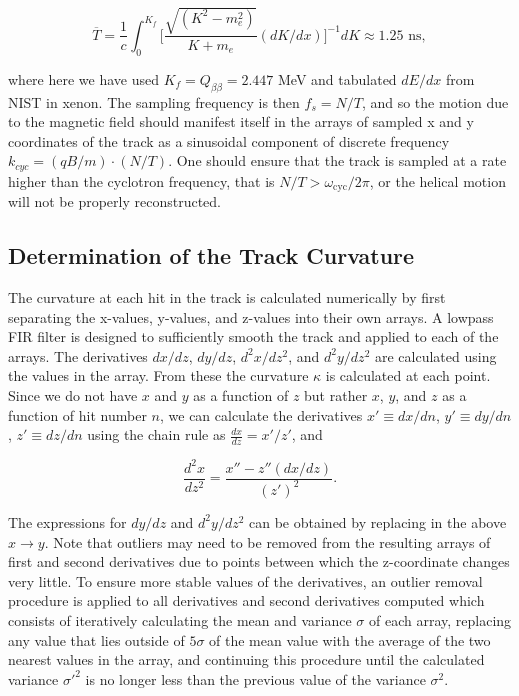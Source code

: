 \documentclass{JINST}
\begin{document}
\begin{equation}
\overline{T} = \frac{1}{c}\int_{0}^{K_{f}} \biggl[\frac{\sqrt{(K^2-m_e^2)}}{K+m_e}(dK/dx)\biggr]^{-1} dK \approx 1.25 \,\, \mathrm{ns},
\end{equation}

\noindent where here we have used $K_{f} = Q_{\beta\beta} = 2.447$ MeV and tabulated 
$dE/dx$ from NIST in xenon.  The sampling frequency is then $f_{s} = N/T$, and so the motion
due to the magnetic field should manifest itself in the arrays of sampled x and y coordinates
of the track as a sinusoidal component of discrete frequency $k_{cyc} = (qB/m)\cdot(N/T)$.
One should ensure that the track is sampled at a rate higher than the cyclotron
frequency, that is $N/T > \omega_{\mathrm{cyc}}/2\pi$, or the helical motion will not be properly
reconstructed.


\subsection{Determination of the Track Curvature}
The curvature at each hit in the track is calculated numerically by first separating the x-values, y-values, and z-values into their own arrays.  A lowpass FIR filter is designed to sufficiently smooth the track and applied to each of the arrays.  The derivatives $dx/dz$, $dy/dz$, $d^2x/dz^2$, and $d^2y/dz^2$ are calculated using the values in the array.  From these the curvature $\kappa$ is calculated at each point.  Since we do not have $x$ and $y$ as a function of $z$ but rather $x$, $y$, and $z$ as a function of hit number $n$, we can calculate the derivatives $x' \equiv dx/dn$, $y' \equiv dy/dn$, $z' \equiv dz/dn$ using the chain rule as $\frac{dx}{dz} = x'/z'$, and

\begin{equation}
\frac{d^2x}{dz^2} = \frac{x'' - z''(dx/dz)}{(z')^2}.
\end{equation}

The expressions for $dy/dz$ and $d^2y/dz^2$ can be obtained by replacing in the above $x \rightarrow y$.  Note that outliers may need to be removed from the resulting arrays of first and second derivatives due to points between which the z-coordinate changes very little.  To ensure more stable values of the derivatives, an outlier removal procedure is applied to all derivatives and second derivatives computed which consists of iteratively calculating the mean and variance $\sigma$ of each array, replacing any value that lies outside of $5\sigma$ of the mean value with the average of the two nearest values in the array, and continuing this procedure until the calculated variance $\sigma'^2$ is no longer less than the previous value of the variance $\sigma^2$. %
\end{document}

